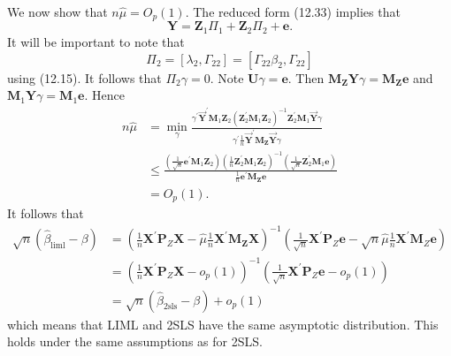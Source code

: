 \documentclass[10pt]{article}
\begin{document}
We now show that $n \widehat{\mu}=O_{p}(1)$. The reduced form (12.33) implies that
$$
\boldsymbol{Y}=\boldsymbol{Z}_{1} \Pi_{1}+\boldsymbol{Z}_{2} \Pi_{2}+\boldsymbol{e} .
$$
It will be important to note that
$$
\Pi_{2}=\left[\lambda_{2}, \Gamma_{22}\right]=\left[\Gamma_{22} \beta_{2}, \Gamma_{22}\right]
$$
using (12.15). It follows that $\Pi_{2} \gamma=0$. Note $\boldsymbol{U} \gamma=\boldsymbol{e}$. Then $\boldsymbol{M}_{\boldsymbol{Z}} \boldsymbol{Y} \gamma=\boldsymbol{M}_{\boldsymbol{Z}} \boldsymbol{e}$ and $\boldsymbol{M}_{1} \boldsymbol{Y} \gamma=\boldsymbol{M}_{1} \boldsymbol{e}$. Hence
$$
\begin{aligned}
n \widehat{\mu} &=\min _{\gamma} \frac{\gamma^{\prime} \overrightarrow{\boldsymbol{Y}}^{\prime} \boldsymbol{M}_{1} \boldsymbol{Z}_{2}\left(\boldsymbol{Z}_{2}^{\prime} \boldsymbol{M}_{1} \boldsymbol{Z}_{2}\right)^{-1} \boldsymbol{Z}_{2}^{\prime} \boldsymbol{M}_{1} \overrightarrow{\boldsymbol{Y}} \gamma}{\gamma^{\prime} \frac{1}{n} \overrightarrow{\boldsymbol{Y}}^{\prime} \boldsymbol{M}_{\boldsymbol{Z}} \overrightarrow{\boldsymbol{Y}} \gamma} \\
& \leq \frac{\left(\frac{1}{\sqrt{n}} \boldsymbol{e}^{\prime} \boldsymbol{M}_{1} \boldsymbol{Z}_{2}\right)\left(\frac{1}{n} \boldsymbol{Z}_{2}^{\prime} \boldsymbol{M}_{1} \boldsymbol{Z}_{2}\right)^{-1}\left(\frac{1}{\sqrt{n}} \boldsymbol{Z}_{2}^{\prime} \boldsymbol{M}_{1} \boldsymbol{e}\right)}{\frac{1}{n} \boldsymbol{e}^{\prime} \boldsymbol{M}_{\boldsymbol{Z}} \boldsymbol{e}} \\
&=O_{p}(1) .
\end{aligned}
$$
It follows that
$$
\begin{aligned}
\sqrt{n}\left(\widehat{\beta}_{\mathrm{liml}}-\beta\right) &=\left(\frac{1}{n} \boldsymbol{X}^{\prime} \boldsymbol{P}_{Z} \boldsymbol{X}-\widehat{\mu} \frac{1}{n} \boldsymbol{X}^{\prime} \boldsymbol{M}_{\boldsymbol{Z}} \boldsymbol{X}\right)^{-1}\left(\frac{1}{\sqrt{n}} \boldsymbol{X}^{\prime} \boldsymbol{P}_{Z} \boldsymbol{e}-\sqrt{n} \widehat{\mu} \frac{1}{n} \boldsymbol{X}^{\prime} \boldsymbol{M}_{Z} \boldsymbol{e}\right) \\
&=\left(\frac{1}{n} \boldsymbol{X}^{\prime} \boldsymbol{P}_{Z} \boldsymbol{X}-o_{p}(1)\right)^{-1}\left(\frac{1}{\sqrt{n}} \boldsymbol{X}^{\prime} \boldsymbol{P}_{Z} \boldsymbol{e}-o_{p}(1)\right) \\
&=\sqrt{n}\left(\widehat{\beta}_{2 \mathrm{sls}}-\beta\right)+o_{p}(1)
\end{aligned}
$$
which means that LIML and 2SLS have the same asymptotic distribution. This holds under the same assumptions as for 2SLS.
\end{document}
